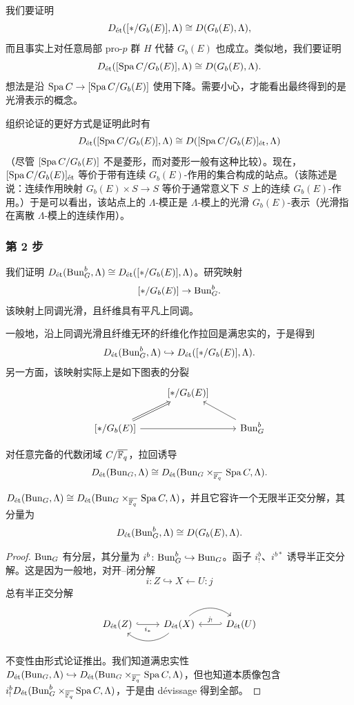 我们要证明
\[
D_{\et}([*/G_b(E)],\Lambda)\cong D(G_b(E),\Lambda),
\]
而且事实上对任意局部 pro-$p$ 群 $H$ 代替 $G_b(E)$ 也成立。类似地，我们要证明
\[
D_{\et}([\Spa C/G_b(E)],\Lambda)\cong D(G_b(E),\Lambda).
\]
想法是沿 $\Spa C\to[\Spa C/G_b(E)]$ 使用下降。需要小心，才能看出最终得到的是光滑表示的概念。

组织论证的更好方式是证明此时有
\[
D_{\et}([\Spa C/G_b(E)],\Lambda)\cong D([\Spa C/G_b(E)]_{\et},\Lambda)
\]
（尽管 $[\Spa C/G_b(E)]$ 不是菱形，而对菱形一般有这种比较）。现在，$[\Spa C/G_b(E)]_{\et}$ 等价于带有连续 $G_b(E)$-作用的集合构成的站点。（该陈述是说：连续作用映射 $G_b(E)\times S\to S$ 等价于通常意义下 $S$ 上的连续 $G_b(E)$-作用。）于是可以看出，该站点上的 $\Lambda$-模正是 $\Lambda$-模上的光滑 $G_b(E)$-表示（光滑指在离散 $\Lambda$-模上的连续作用）。

\subsubsection{第 2 步}

我们证明 $D_{\et}(\Bun^b_G,\Lambda)\cong D_{\et}([*/G_b(E)],\Lambda)$。研究映射
\[
[*/G_b(E)]\to\Bun^b_G.
\]
该映射上同调光滑，且纤维具有平凡上同调。

一般地，沿上同调光滑且纤维无环的纤维化作拉回是满忠实的，于是得到
\[
D_{\et}(\Bun^b_G,\Lambda)\hookrightarrow D_{\et}([*/G_b(E)],\Lambda).
\]
另一方面，该映射实际上是如下图表的分裂
\[
\begin{tikzcd}
& {[* / G_b(E)]} & \\
{[* / G_b(E)]} \arrow[rr] \arrow[ur, Rightarrow] & & \Bun^b_G \arrow[ul]
\end{tikzcd}
\]

\begin{corollary}[证明中的]
对任意完备的代数闭域 $C/\ol{\Fq}$，拉回诱导
\[
D_{\et}(\Bun_G,\Lambda)\cong D_{\et}(\Bun_G\times_{\ol{\Fq}}\,\Spa C,\Lambda).
\]
\end{corollary}

\begin{corollary}
$D_{\et}(\Bun_G,\Lambda)\cong D_{\et}(\Bun_G\times_{\ol{\Fq}}\,\Spa C,\Lambda)$，并且它容许一个无限半正交分解，其分量为
\[
D_{\et}(\Bun^b_G,\Lambda)\cong D(G_b(E),\Lambda).
\]
\end{corollary}

\begin{proof}
$\Bun_G$ 有分层，其分量为 $i^b\colon\Bun^b_G\hookrightarrow\Bun_G$。函子 $i^b_!$、$i^{b*}$ 诱导半正交分解。这是因为一般地，对开--闭分解
\[
i\colon Z\hookrightarrow X\leftarrow U\colon j
\]
总有半正交分解
\[
\begin{tikzcd}
D_{\et}(Z) \arrow[r, hook, "i_*"'] & D_{\et}(X) \arrow[l, bend left=40] \arrow[r, bend left=40] & D_{\et}(U) \arrow[l, hook', "j_!"']
\end{tikzcd}
\]


不变性由形式论证推出。我们知道满忠实性 $D_{\et}(\Bun_G,\Lambda)\hookrightarrow D_{\et}(\Bun_G\times_{\ol{\Fq}}\,\Spa C,\Lambda)$，但也知道本质像包含 $i^b_!D_{\et}(\Bun^b_G\times_{\ol{\Fq}}\Spa C,\Lambda)$，于是由 dévissage 得到全部。
\end{proof}

